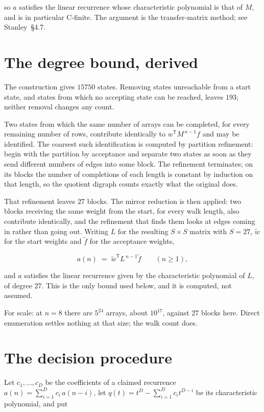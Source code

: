 \documentclass[11pt]{article}
\theoremstyle{definition}
\begin{document}
so $a$ satisfies the linear recurrence whose characteristic polynomial is that of $M$, and is in particular C-finite. The argument is the transfer-matrix method; see Stanley~\S4.7.

\section{The degree bound, derived}

The construction gives $15750$ states. Removing states unreachable from a start state, and states from which no accepting state can be reached, leaves $193$; neither removal changes any count.

Two states from which the same number of arrays can be completed, for every remaining number of rows, contribute identically to $w^{\mathsf T}M^{\,n-1}f$ and may be identified. The coarsest such identification is computed by partition refinement: begin with the partition by acceptance and separate two states as soon as they send different numbers of edges into some block. The refinement terminates; on its blocks the number of completions of each length is constant by induction on that length, so the quotient digraph counts exactly what the original does.

That refinement leaves $27$ blocks. The mirror reduction is then applied: two blocks receiving the same weight from the start, for every walk length, also contribute identically, and the refinement that finds them looks at edges coming in rather than going out. Writing $L$ for the resulting $S \times S$ matrix with $S = 27$, $\tilde w$ for the start weights and $\tilde f$ for the acceptance weights,

\[a(n) \;=\; \tilde w^{\mathsf T} L^{\,n-1} \tilde f \qquad (n \ge 1),\]

and $a$ satisfies the linear recurrence given by the characteristic polynomial of $L$, of degree $27$. This is the only bound used below, and it is computed, not assumed.

For scale: at $n = 8$ there are $5^{24}$ arrays, about $10^{17}$, against $27$ blocks here. Direct enumeration settles nothing at that size; the walk count does.

\section{The decision procedure}

Let $c_1,\dots,c_D$ be the coefficients of a claimed recurrence $a(n) = \sum_{i=1}^{D} c_i\,a(n-i)$, let $q(t) = t^{D} - \sum_{i=1}^{D} c_i t^{D-i}$ be its characteristic polynomial, and put
\end{document}
